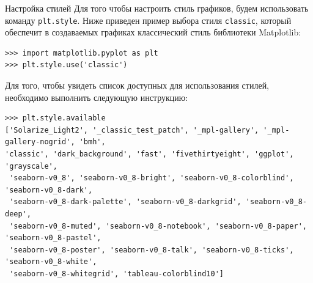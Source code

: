 \documentclass[aspectratio=169, mathserif]{beamer}	%
\begin{document}
\begin{frame}[fragile, label=m]{Настройка стилей}
\scriptsize
Для того чтобы настроить стиль графиков, будем использовать команду \texttt{plt.style}. Ниже приведен пример выбора стиля \texttt{classic}, который обеспечит в создаваемых  графиках классический стиль библиотеки Matplotlib:
\vfill
\begin{verbatim}
>>> import matplotlib.pyplot as plt
>>> plt.style.use('classic')
\end{verbatim}
\vfill
Для того, чтобы увидеть список доступных для использования стилей, необходимо выполнить следующую инструкцию:
\begin{verbatim}
>>> plt.style.available
['Solarize_Light2', '_classic_test_patch', '_mpl-gallery', '_mpl-gallery-nogrid', 'bmh',
'classic', 'dark_background', 'fast', 'fivethirtyeight', 'ggplot', 'grayscale',
 'seaborn-v0_8', 'seaborn-v0_8-bright', 'seaborn-v0_8-colorblind', 'seaborn-v0_8-dark',
 'seaborn-v0_8-dark-palette', 'seaborn-v0_8-darkgrid', 'seaborn-v0_8-deep',
 'seaborn-v0_8-muted', 'seaborn-v0_8-notebook', 'seaborn-v0_8-paper', 'seaborn-v0_8-pastel',
 'seaborn-v0_8-poster', 'seaborn-v0_8-talk', 'seaborn-v0_8-ticks', 'seaborn-v0_8-white',
 'seaborn-v0_8-whitegrid', 'tableau-colorblind10']
\end{verbatim}
\vfill
\end{frame}
\end{document}
